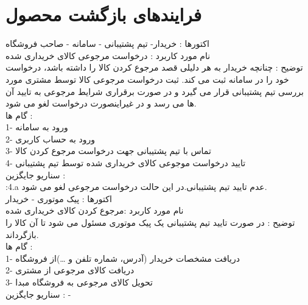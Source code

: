 \documentclass[14pt]{article}
\begin{document}
 
\section{ فرایندهای بازگشت محصول}
 
اکتورها : خریدار- تیم پشتیبانی - سامانه - صاحب فروشگاه    \\
نام مورد کاربرد : درخواست مرجوعی کالای خریداری شده\\
توضیح : چنانچه خریدار به هر دلیلی قصد مرجوع کردن کالا را داشته باشد، درخواست خود را در سامانه ثبت می کند. ثبت درخواست مرجوعی کالا توسط مشتری مورد بررسی تیم پشتیبانی قرار می گیرد و در صورت برقراری شرایط مرجوعی به تایید آن ها می رسد و در غیراینصورت درخواست لغو می شود.\\
گام ها :\\
1- ورود به سامانه\\
2- ورود به حساب کاربری\\
3-  تماس با تیم پشتیبانی جهت درخواست مرجوع کردن کالا\\
4- تایید درخواست موجوعی کالای خریداری شده توسط تیم پشتیبانی\\
سناریو جایگزین : \\
:4.a عدم تایید تیم پشتیبانی.در این حالت درخواست مرجوعی لغو می شود.\\


اکتورها : پیک موتوری - خریدار\\
نام مورد کاربرد :مرجوع کردن کالای خریداری شده\\
توضیح :  در صورت تایید تیم پشتیبانی یک پیک موتوری مسئول می شود تا آن کالا را بازگرداند.\\
گام ها :\\
1- دریافت مشخصات خریدار (آدرس، شماره تلفن و …)از فروشگاه\\
2- دریافت کالای مرجوعی از مشتری\\
3- تحویل کالای مرجوعی به فروشگاه مبدا\\
سناریو جایگزین : -\\
\end{document}

